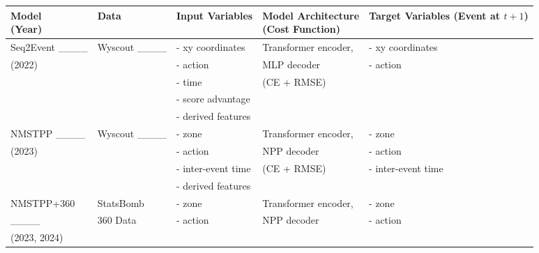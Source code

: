 \begin{table}[h]
\centering
\begin{tabular}{lllll}
\toprule
\parbox{2cm}{ \textbf{Model} \\ \textbf{(Year)}}    & \textbf{Data}       & \textbf{Input Variables}                 & \parbox{3cm}{ \textbf{Model Architecture} \\ \textbf{(Cost Function)}}           & \parbox{3cm}{ \textbf{Target Variables} \\ \textbf{(Event at $t+1$)}}            \\ 
\midrule
Seq2Event ____        & Wyscout ____            & - xy coordinates                & Transformer encoder,            & - xy coordinates             \\ 
(2022)                 &                     & - action                        & MLP decoder                     & - action          \\ 
                 &                     & - time                          & (CE + RMSE)                              &                              \\ 
                 &                     & - score advantage               &                                 &                              \\ 
                 &                     & - derived features\footnotemark[2]              &                                 &                              \\ 
\hline
NMSTPP ____           & Wyscout ____            & - zone                          & Transformer encoder,            & - zone                      \\ 
(2023)                 &                     & - action                        & NPP decoder                     & - action                    \\ 
                 &                     & - inter-event time              & (CE + RMSE)                               & - inter-event time \\ 
                 &                     & - derived features\footnotemark[2]              &                                 &                              \\ 
\hline
NMSTPP+360      & StatsBomb           & - zone                          & Transformer encoder,            & - zone                      \\ 
____                  &   360 Data                  & - action                        & NPP decoder                     & - action                    \\ (2023, 2024)

\end{tabular}
\end{table}
